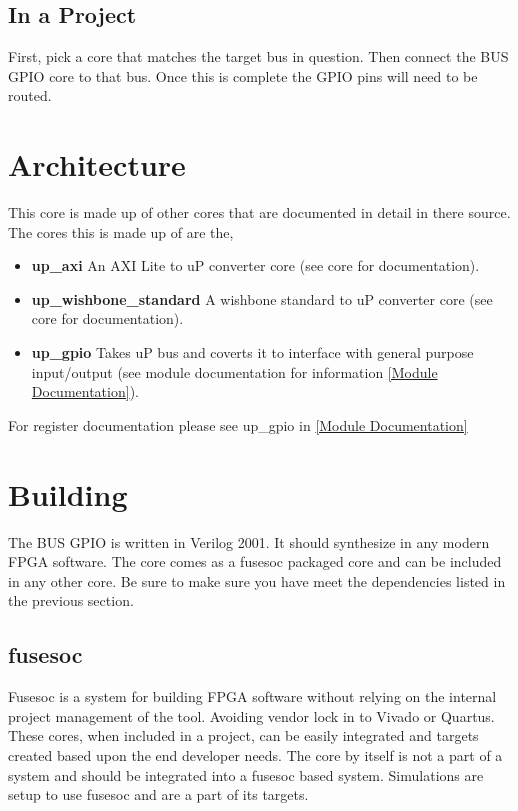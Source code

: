 





\subsection{In a Project}
\par
First, pick a core that matches the target bus in question. Then connect the BUS GPIO core to that bus. Once this is complete the GPIO pins will need
to be routed.

\section{Architecture}
\par
This core is made up of other cores that are documented in detail in there source. The cores this is made up of are the,
\begin{itemize}
  \item \textbf{up\_axi} An AXI Lite to uP converter core (see core for documentation).
  \item \textbf{up\_wishbone\_standard} A wishbone standard to uP converter core (see core for documentation).
  \item \textbf{up\_gpio} Takes uP bus and coverts it to interface with general purpose input/output (see module documentation for information \ref{Module Documentation}).
\end{itemize}

For register documentation please see up\_gpio in \ref{Module Documentation}

\section{Building}

\par
The BUS GPIO is written in Verilog 2001. It should synthesize in any modern FPGA software. The core comes as a fusesoc packaged core and can be
included in any other core. Be sure to make sure you have meet the dependencies listed in the previous section.

\subsection{fusesoc}
\par
Fusesoc is a system for building FPGA software without relying on the internal project management of the tool. Avoiding vendor lock in to Vivado or Quartus.
These cores, when included in a project, can be easily integrated and targets created based upon the end developer needs. The core by itself is not a part of
a system and should be integrated into a fusesoc based system. Simulations are setup to use fusesoc and are a part of its targets.

